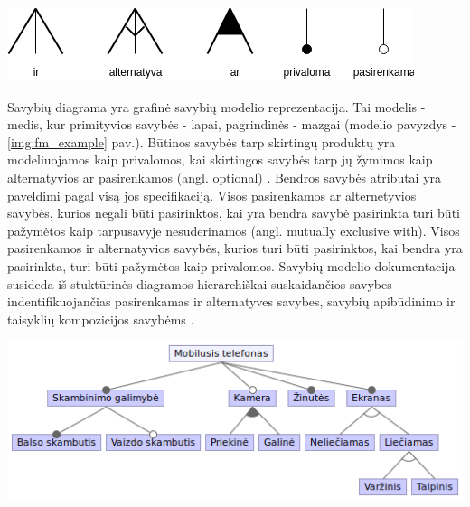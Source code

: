 \documentclass{VUMIFPSkursinis}
\begin{document}
\begin{center}
    \includegraphics[scale=0.75]{img/feature_model_rules}
    \label{img:fm_rules}

\end{center}

Savybių diagrama yra grafinė savybių modelio reprezentacija. Tai modelis - medis, kur primityvios savybės - lapai, pagrindinės - mazgai (modelio pavyzdys - \ref{img:fm_example} pav.). Būtinos savybės tarp skirtingų produktų yra modeliuojamos kaip privalomos, kai skirtingos savybės tarp jų žymimos kaip alternatyvios ar pasirenkamos (angl. optional) \cite{Batory2005}. Bendros savybės atributai yra paveldimi pagal visą jos specifikaciją. Visos pasirenkamos ar alternetyvios savybės, kurios negali būti pasirinktos, kai yra bendra savybė pasirinkta turi būti pažymėtos kaip tarpusavyje nesuderinamos (angl. mutually exclusive with). Visos pasirenkamos ir alternatyvios savybės, kurios turi būti pasirinktos, kai bendra yra pasirinkta, turi būti pažymėtos kaip privalomos. Savybių modelio dokumentacija susideda iš stuktūrinės diagramos hierarchiškai suskaidančios savybes indentifikuojančias pasirenkamas ir alternatyves savybes, savybių apibūdinimo ir taisyklių kompozicijos savybėms \cite{Kang1990}. 

\begin{center}
    \includegraphics[scale=0.6]{img/mobile}
    \label{img:fm_example}
\end{center}
\end{document}
